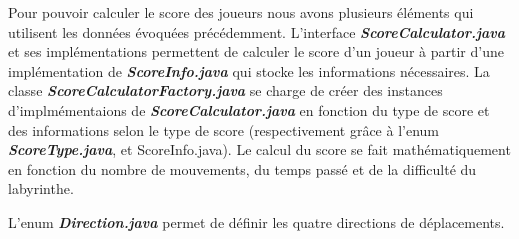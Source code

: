 Pour pouvoir calculer le score des joueurs nous avons plusieurs éléments qui
utilisent les données évoquées précédemment. L'interface \textbf{\textit{ScoreCalculator.java}}
et ses implémentations permettent de calculer le score d'un joueur à partir
d'une implémentation de \textbf{\textit{ScoreInfo.java}} qui stocke les informations
nécessaires. La classe \textbf{\textit{ScoreCalculatorFactory.java}} se charge de créer des
instances d'implmémentaions de \textbf{\textit{ScoreCalculator.java}} en fonction du type de
score et des informations selon le type de score (respectivement grâce à l'enum
\textbf{\textit{ScoreType.java}}, et ScoreInfo.java). Le calcul du score se fait
mathématiquement en fonction du nombre de mouvements, du temps passé et de la
difficulté du labyrinthe.

L'enum \textbf{\textit{Direction.java}} permet de définir les quatre directions de déplacements.
